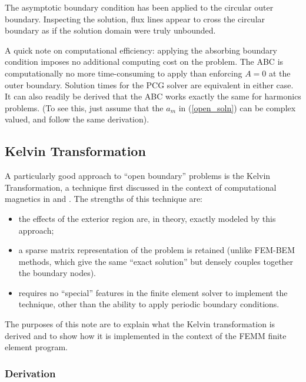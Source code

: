 \documentclass[12pt]{report}
\begin{document}
The asymptotic boundary condition has been applied to the circular
outer boundary.  Inspecting the solution, flux lines appear to
cross the circular boundary as if the solution domain were truly
unbounded.

A quick note on computational efficiency: applying the absorbing
boundary condition imposes no additional computing cost on the
problem.  The ABC is computationally no more time-consuming to
apply than enforcing $A=0$ at the outer boundary.  Solution times
for the PCG solver are equivalent in either case.  It can also
readily be derived that the ABC works exactly the same for
harmonics problems. (To see this, just assume that the $a_m$ in
(\ref{open_soln}) can be complex valued, and follow the same
derivation).

\subsection{Kelvin Transformation} \label{KelvinBC}


A particularly good approach to ``open boundary'' problems is the
Kelvin Transformation, a technique first discussed in the context
of computational magnetics in \cite{LowFree} and \cite{LowFreeFor}.
The strengths of this technique are:
\begin{itemize}
\item the effects of the exterior region are, in theory, exactly
modeled by this approach;
\item a sparse matrix representation of the problem is retained
(unlike FEM-BEM methods, which give the same ``exact solution'' but
densely couples together the boundary nodes).
\item requires no ``special'' features in the finite element
solver to implement the technique, other than the ability to apply
periodic boundary conditions.
\end{itemize}
The purposes of this note are to explain what the Kelvin
transformation is derived and to show how it is implemented in the
context of the FEMM finite element program.

\subsubsection{Derivation}
\end{document}
